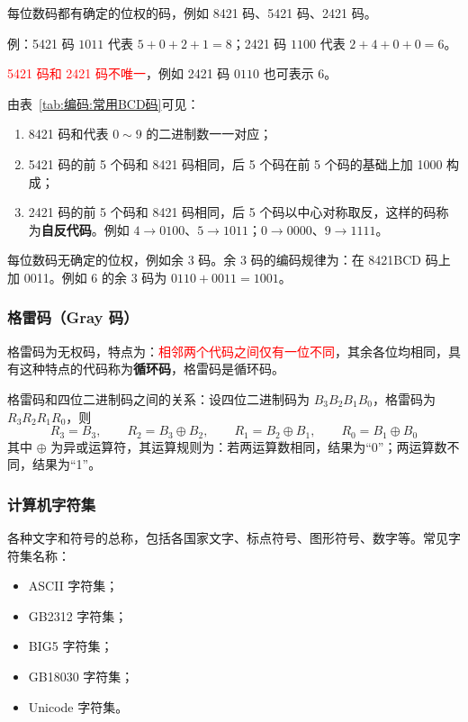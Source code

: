 \begin{definition}[有权 BCD 码]
\label{def:有权BCD码}
每位数码都有确定的位权的码，例如 8421 码、5421 码、2421 码。

例：5421 码 $1011$ 代表 $5+0+2+1=8$；2421 码 $1100$ 代表 $2+4+0+0=6$。

\textcolor{red}{5421 码和 2421 码不唯一}，例如 2421 码 $0110$ 也可表示 6。
\end{definition}

由表~\ref{tab:编码:常用BCD码}可见：
\begin{enumerate}
	\item 8421 码和代表 $0\sim9$ 的二进制数一一对应；
	\item 5421 码的前 5 个码和 8421 码相同，后 5 个码在前 5 个码的基础上加 1000 构成；
	\item 2421 码的前 5 个码和 8421 码相同，后 5 个码以中心对称取反，这样的码称为\textbf{自反代码}。例如 $4\to0100$、$5\to1011$；$0\to0000$、$9\to1111$。
\end{enumerate}

\begin{definition}[无权 BCD 码（余 3 码）]
\label{def:余三码}
每位数码无确定的位权，例如余 3 码。余 3 码的编码规律为：在 8421BCD 码上加 0011。例如 6 的余 3 码为 $0110+0011=1001$。
\end{definition}

\subsubsection{格雷码（Gray 码）}

格雷码为无权码，特点为：\textcolor{red}{相邻两个代码之间仅有一位不同}，其余各位均相同，具有这种特点的代码称为\textbf{循环码}，格雷码是循环码。

格雷码和四位二进制码之间的关系：设四位二进制码为 $B_3B_2B_1B_0$，格雷码为 $R_3R_2R_1R_0$，则
\begin{equation}
	R_3=B_3,\qquad R_2=B_3\oplus B_2,\qquad R_1=B_2\oplus B_1,\qquad R_0=B_1\oplus B_0
	\label{eq:编码:格雷码}
\end{equation}
其中 $\oplus$ 为异或运算符，其运算规则为：若两运算数相同，结果为“0”；两运算数不同，结果为“1”。

\subsubsection{计算机字符集}

各种文字和符号的总称，包括各国家文字、标点符号、图形符号、数字等。常见字符集名称：
\begin{itemize}
	\item ASCII 字符集；
	\item GB2312 字符集；
	\item BIG5 字符集；
	\item GB18030 字符集；
	\item Unicode 字符集。
\end{itemize}

